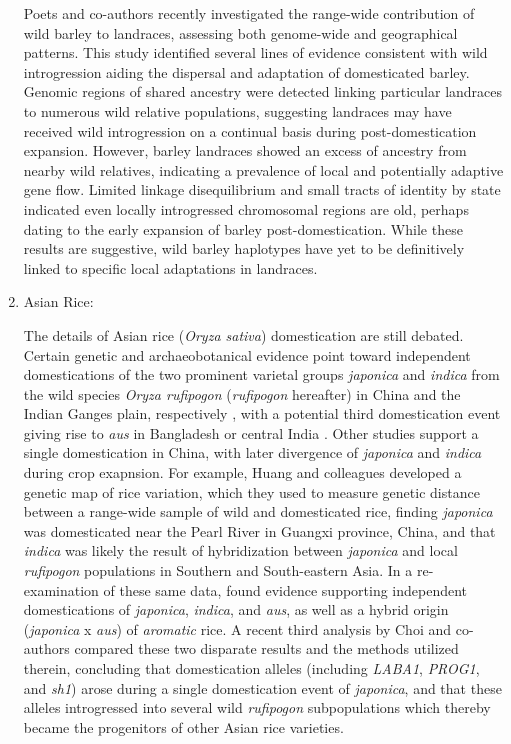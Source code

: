 \documentclass[11pt]{article}
\begin{document}
\begin{enumerate}
Poets and co-authors \cite{Poets2015} recently investigated the range-wide contribution of wild barley to landraces, assessing both genome-wide and geographical patterns.
This study identified several lines of evidence consistent with wild introgression aiding the dispersal and adaptation of domesticated barley.
Genomic regions of shared ancestry were detected linking particular landraces to numerous wild relative populations, suggesting landraces may have received wild introgression on a continual basis during post-domestication expansion.
However, barley landraces showed an excess of ancestry from nearby wild relatives, indicating a prevalence of local and potentially adaptive gene flow.
Limited linkage disequilibrium and small tracts of identity by state indicated even locally introgressed chromosomal regions are old, perhaps dating to the early expansion of barley  post-domestication.
While these results are suggestive, wild barley haplotypes have yet to be definitively linked to specific local adaptations in landraces.


\item{Asian Rice:}

The details of Asian rice (\emph{Oryza sativa}) domestication are still debated.
Certain genetic and archaeobotanical evidence point toward independent domestications of the two prominent varietal groups \emph{japonica} and \emph{indica} from the wild species \emph{Oryza rufipogon} (\emph{rufipogon} hereafter) in China and the Indian Ganges plain, respectively \cite{fuller2010consilience}, with a potential third domestication event giving rise to \emph{aus} in Bangladesh or central India \cite{civavn2015three}.
Other studies support a single domestication in China, with later divergence of \emph{japonica} and \emph{indica} \cite{molina2011molecular, Huang2012} during crop exapnsion.
For example, Huang and colleagues \cite{Huang2012} developed a genetic map of rice variation, which they used to measure genetic distance between a range-wide sample of wild and domesticated rice, finding \emph{japonica} was domesticated near the Pearl River in Guangxi province, China, and that \emph{indica} was likely the result of hybridization between \emph{japonica} and local \emph{rufipogon} populations in Southern and South-eastern Asia.
In a re-examination of these same data, \cite{civavn2015three} found evidence supporting independent domestications of \emph{japonica}, \emph{indica}, and \emph{aus}, as well as a hybrid origin (\emph{japonica} x \emph{aus}) of \emph{aromatic} rice.
A recent third analysis by Choi and co-authors \cite{choi2018multiple} compared these two disparate results and the methods utilized therein, concluding that domestication alleles (including \emph{LABA1}, \emph{PROG1}, and \emph{sh1}) arose during a single domestication event of \emph{japonica}, and that these alleles introgressed into several wild \emph{rufipogon} subpopulations which thereby became the progenitors of other Asian rice varieties.


\end{enumerate}
\end{document}
